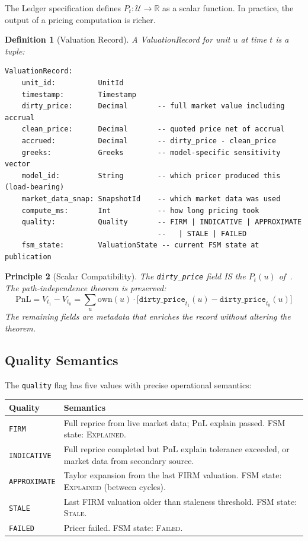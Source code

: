 \documentclass[11pt,a4paper]{article}
\newtheorem{definition}{Definition}[section]
\newtheorem{principle}[definition]{Principle}
\begin{document}
The Ledger specification defines $P_t : \mathcal{U} \to \mathbb{R}$ as a scalar function.  In practice, the output of a pricing computation is richer.

\begin{definition}[Valuation Record]
\label{def:valuation-record}
A \emph{ValuationRecord} for unit $u$ at time $t$ is a tuple:
\begin{lstlisting}
ValuationRecord:
    unit_id:          UnitId
    timestamp:        Timestamp
    dirty_price:      Decimal       -- full market value including accrual
    clean_price:      Decimal       -- quoted price net of accrual
    accrued:          Decimal       -- dirty_price - clean_price
    greeks:           Greeks        -- model-specific sensitivity vector
    model_id:         String        -- which pricer produced this (load-bearing)
    market_data_snap: SnapshotId    -- which market data was used
    compute_ms:       Int           -- how long pricing took
    quality:          Quality       -- FIRM | INDICATIVE | APPROXIMATE
                                    --   | STALE | FAILED
    fsm_state:        ValuationState -- current FSM state at publication
\end{lstlisting}
\end{definition}

\begin{principle}[Scalar Compatibility]
\label{princ:scalar-compat}
The \texttt{dirty\_price} field IS the $P_t(u)$ of~\cite[\S4.1]{ledger}.  The path-independence theorem is preserved:
\[
\mathrm{PnL} = V_{t_1} - V_{t_0} = \sum_{u} \mathrm{own}(u) \cdot \bigl[\texttt{dirty\_price}_{t_1}(u) - \texttt{dirty\_price}_{t_0}(u)\bigr]
\]
The remaining fields are metadata that enriches the record without altering the theorem.
\end{principle}

\subsection{Quality Semantics}

The \texttt{quality} flag has five values with precise operational semantics:

\begin{center}
\small
\begin{tabular}{l p{9cm}}
\toprule
\textbf{Quality} & \textbf{Semantics} \\
\midrule
\texttt{FIRM} & Full reprice from live market data; PnL explain passed.  FSM state: \textsc{Explained}. \\
\texttt{INDICATIVE} & Full reprice completed but PnL explain tolerance exceeded, or market data from secondary source. \\
\texttt{APPROXIMATE} & Taylor expansion from the last FIRM valuation.  FSM state: \textsc{Explained} (between cycles). \\
\texttt{STALE} & Last FIRM valuation older than staleness threshold.  FSM state: \textsc{Stale}. \\
\texttt{FAILED} & Pricer failed.  FSM state: \textsc{Failed}. \\
\bottomrule
\end{tabular}
\end{center}
\end{document}
